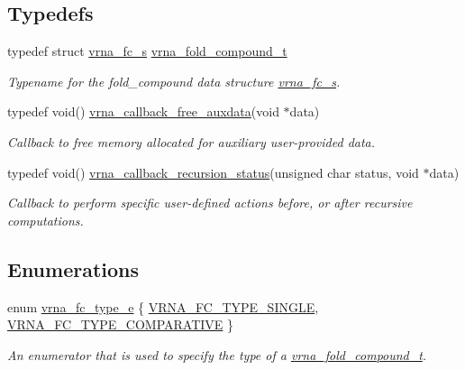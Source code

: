 \subsection*{Typedefs}
\begin{DoxyCompactItemize}
\item 
\mbox{\label{group__fold__compound_ga1b0cef17fd40466cef5968eaeeff6166}} 
typedef struct \hyperlink{group__fold__compound_structvrna__fc__s}{vrna\+\_\+fc\+\_\+s} \hyperlink{group__fold__compound_ga1b0cef17fd40466cef5968eaeeff6166}{vrna\+\_\+fold\+\_\+compound\+\_\+t}
\begin{DoxyCompactList}\small\item\em Typename for the fold\+\_\+compound data structure \hyperlink{group__fold__compound_structvrna__fc__s}{vrna\+\_\+fc\+\_\+s}. \end{DoxyCompactList}\item 
typedef void() \hyperlink{group__fold__compound_ga7806651f51b195013839a218b3bbd5a3}{vrna\+\_\+callback\+\_\+free\+\_\+auxdata}(void $\ast$data)
\begin{DoxyCompactList}\small\item\em Callback to free memory allocated for auxiliary user-\/provided data. \end{DoxyCompactList}\item 
typedef void() \hyperlink{group__fold__compound_gac86036fa8cad1108832335063243cdc8}{vrna\+\_\+callback\+\_\+recursion\+\_\+status}(unsigned char status, void $\ast$data)
\begin{DoxyCompactList}\small\item\em Callback to perform specific user-\/defined actions before, or after recursive computations. \end{DoxyCompactList}\end{DoxyCompactItemize}
\subsection*{Enumerations}
\begin{DoxyCompactItemize}
\item 
enum \hyperlink{group__fold__compound_ga01a4ff86fa71deaaa5d1abbd95a1447d}{vrna\+\_\+fc\+\_\+type\+\_\+e} \{ \hyperlink{group__fold__compound_gga01a4ff86fa71deaaa5d1abbd95a1447da7e264dd3cf2dc9b6448caabcb7763cd6}{V\+R\+N\+A\+\_\+\+F\+C\+\_\+\+T\+Y\+P\+E\+\_\+\+S\+I\+N\+G\+LE}, 
\hyperlink{group__fold__compound_gga01a4ff86fa71deaaa5d1abbd95a1447dab821ce46ea3cf665be97df22a76f5023}{V\+R\+N\+A\+\_\+\+F\+C\+\_\+\+T\+Y\+P\+E\+\_\+\+C\+O\+M\+P\+A\+R\+A\+T\+I\+VE}
 \}\begin{DoxyCompactList}\small\item\em An enumerator that is used to specify the type of a \hyperlink{group__fold__compound_ga1b0cef17fd40466cef5968eaeeff6166}{vrna\+\_\+fold\+\_\+compound\+\_\+t}. \end{DoxyCompactList}
\end{DoxyCompactItemize}
